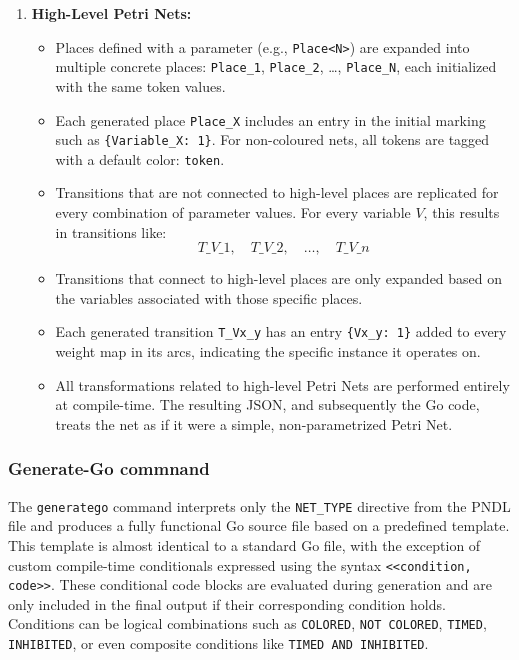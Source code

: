 \documentclass[12pt]{article}
\begin{document}
\begin{enumerate}
            \item \textbf{High-Level Petri Nets:}
            \begin{itemize}
                \item Places defined with a parameter (e.g., \texttt{Place<N>}) are expanded into multiple concrete places: \texttt{Place\_1}, \texttt{Place\_2}, \dots, \texttt{Place\_N}, each initialized with the same token values.
                \item Each generated place \texttt{Place\_X} includes an entry in the initial marking such as \texttt{\{Variable\_X: 1\}}. For non-coloured nets, all tokens are tagged with a default color: \texttt{token}.
                \item Transitions that are not connected to high-level places are replicated for every combination of parameter values. For every variable $V$, this results in transitions like:
                \[
                    T\_V\_1, \quad T\_V\_2, \quad \dots, \quad T\_V\_n
                \]
                \item Transitions that connect to high-level places are only expanded based on the variables associated with those specific places.
                \item Each generated transition \texttt{T\_Vx\_y} has an entry \texttt{\{Vx\_y: 1\}} added to every weight map in its arcs, indicating the specific instance it operates on.
                \item All transformations related to high-level Petri Nets are performed entirely at compile-time. The resulting JSON, and subsequently the Go code, treats the net as if it were a simple, non-parametrized Petri Net.
            \end{itemize}
        \end{enumerate}
        \subsubsection{Generate-Go commnand}
            The \texttt{generate\-go} command interprets only the \texttt{NET\_TYPE} directive from the PNDL file and produces a fully functional Go source file based on a predefined template. This template is almost identical to a standard Go file, with the exception of custom compile-time conditionals expressed using the syntax \texttt{<<condition, code>>}. These conditional code blocks are evaluated during generation and are only included in the final output if their corresponding condition holds. Conditions can be logical combinations such as \texttt{COLORED}, \texttt{NOT COLORED}, \texttt{TIMED}, \texttt{INHIBITED}, or even composite conditions like \texttt{TIMED AND INHIBITED}.
\end{document}
